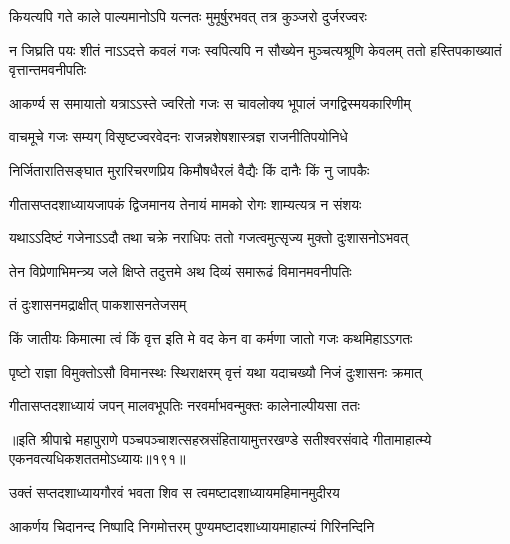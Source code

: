\twolineshloka
{कियत्यपि गते काले पाल्यमानोऽपि यत्नतः}
{मुमूर्षुरभवत् तत्र कुञ्जरो दुर्जरज्वरः} %

\threelineshloka
{न जिघ्रति पयः शीतं नाऽऽदत्ते कवलं गजः}
{स्वपित्यपि न सौख्येन मुञ्चत्यश्रूणि केवलम्}
{ततो हस्तिपकाख्यातं वृत्तान्तमवनीपतिः} %

\twolineshloka
{आकर्ण्य स समायातो यत्राऽऽस्ते ज्वरितो गजः}
{स चावलोक्य भूपालं जगद्विस्मयकारिणीम्} %

\twolineshloka
{वाचमूचे गजः सम्यग् विसृष्टज्वरवेदनः}
{राजन्नशेषशास्त्रज्ञ राजनीतिपयोनिधे} %

\twolineshloka
{निर्जितारातिसङ्घात मुरारिचरणप्रिय}
{किमौषधैरलं वैद्यैः किं दानैः किं नु जापकैः} %

\twolineshloka
{गीतासप्तदशाध्यायजापकं द्विजमानय}
{तेनायं मामको रोगः शाम्यत्यत्र न संशयः} %

\twolineshloka
{यथाऽऽदिष्टं गजेनाऽऽदौ तथा चक्रे नराधिपः}
{ततो गजत्वमुत्सृज्य मुक्तो दुःशासनोऽभवत्} %

\twolineshloka
{तेन विप्रेणाभिमन्त्र्य जले क्षिप्ते तदुत्तमे}
{अथ दिव्यं समारूढं विमानमवनीपतिः} %

\onelineshloka
{तं दुःशासनमद्राक्षीत् पाकशासनतेजसम्} %


\twolineshloka
{किं जातीयः किमात्मा त्वं किं वृत्त इति मे वद}
{केन वा कर्मणा जातो गजः कथमिहाऽऽगतः} %

\twolineshloka
{पृष्टो राज्ञा विमुक्तोऽसौ विमानस्थः स्थिराक्षरम्}
{वृत्तं यथा यदाचख्यौ निजं दुःशासनः क्रमात्} %

\twolineshloka
{गीतासप्तदशाध्यायं जपन् मालवभूपतिः}
{नरवर्माभवन्मुक्तः कालेनाल्पीयसा ततः} %

॥इति श्रीपाद्मे महापुराणे पञ्चपञ्चाशत्सहस्रसंहितायामुत्तरखण्डे सतीश्वरसंवादे गीतामाहात्म्ये एकनवत्यधिकशततमोऽध्यायः॥१९१॥

\genMangalaShloka

\closesub

\ganapatyadiDhyanam
\padmaPuranam



\twolineshloka
{उक्तं सप्तदशाध्यायगौरवं भवता शिव}
{स त्वमष्टादशाध्यायमहिमानमुदीरय} %


\twolineshloka
{आकर्णय चिदानन्द निष्पादि निगमोत्तरम्}
{पुण्यमष्टादशाध्यायमाहात्म्यं गिरिनन्दिनि} %

